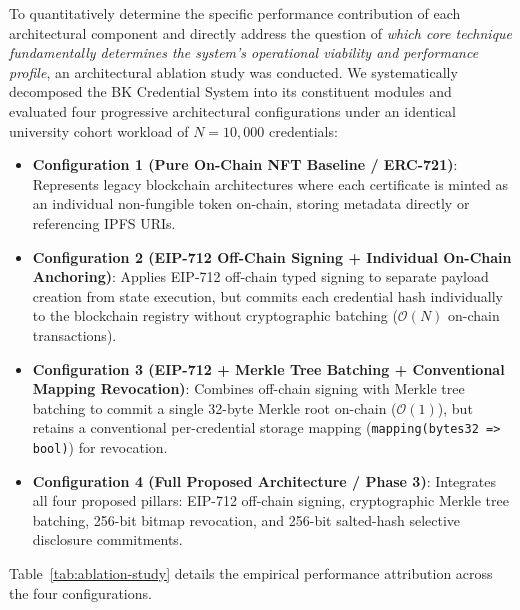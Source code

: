 To quantitatively determine the specific performance contribution of each architectural component and directly address the question of \textit{which core technique fundamentally determines the system's operational viability and performance profile}, an architectural ablation study was conducted. We systematically decomposed the BK Credential System into its constituent modules and evaluated four progressive architectural configurations under an identical university cohort workload of $N = 10{,}000$ credentials:

\begin{itemize}
    \item \textbf{Configuration 1 (Pure On-Chain NFT Baseline / ERC-721)}: Represents legacy blockchain architectures where each certificate is minted as an individual non-fungible token on-chain, storing metadata directly or referencing IPFS URIs.
    \item \textbf{Configuration 2 (EIP-712 Off-Chain Signing + Individual On-Chain Anchoring)}: Applies EIP-712 off-chain typed signing to separate payload creation from state execution, but commits each credential hash individually to the blockchain registry without cryptographic batching ($\mathcal{O}(N)$ on-chain transactions).
    \item \textbf{Configuration 3 (EIP-712 + Merkle Tree Batching + Conventional Mapping Revocation)}: Combines off-chain signing with Merkle tree batching to commit a single 32-byte Merkle root on-chain ($\mathcal{O}(1)$), but retains a conventional per-credential storage mapping (\texttt{mapping(bytes32 => bool)}) for revocation.
    \item \textbf{Configuration 4 (Full Proposed Architecture / Phase 3)}: Integrates all four proposed pillars: EIP-712 off-chain signing, cryptographic Merkle tree batching, 256-bit bitmap revocation, and 256-bit salted-hash selective disclosure commitments.
\end{itemize}

Table~\ref{tab:ablation-study} details the empirical performance attribution across the four configurations.

